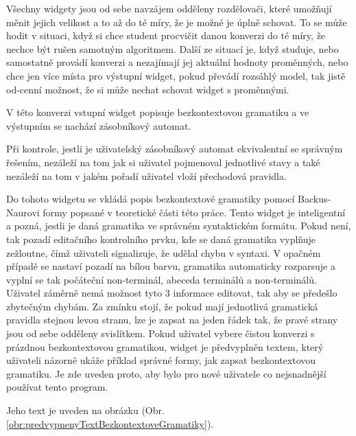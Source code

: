 Všechny widgety jsou od sebe navzájem odděleny rozdělovači, které umožňují měnit jejich velikost a to až do té míry, že je možné je úplně schovat. To se může hodit v situaci, když si chce student procvičit danou konverzi do té míry, že nechce být rušen samotným algoritmem. Další ze situací je, když studuje, nebo samostatně provádí konverzi a nezajímají jej aktuální hodnoty proměnných, nebo chce jen více místa pro výstupní widget, pokud převádí rozsáhlý model, tak jistě od-cenní možnost, že si může nechat schovat widget s proměnnými.

V této konverzi vstupní widget popisuje bezkontextovou gramatiku a ve výstupním se nachází zásobníkový automat.

Při kontrole, jestli je uživatelský zásobníkový automat ekvivalentní se správným řešením, nezáleží na tom jak si uživatel pojmenoval jednotlivé stavy a také nezáleží na tom v jakém pořadí uživatel vloží přechodová pravidla.




Do tohoto widgetu se vkládá popis bezkontextové gramatiky pomocí Backus-Naurovi formy popsané v teoretické části této práce. Tento widget je inteligentní a pozná, jestli je daná gramatika ve správném syntaktickém formátu. Pokud není, tak pozadí editačního kontrolního prvku, kde se daná gramatika vyplňuje zežloutne, čímž uživateli signalizuje, že udělal chybu v syntaxi. V opačném případě se nastaví pozadí na bílou barvu, gramatika automaticky rozparsuje a vyplní se tak počáteční non-terminál, abeceda terminálů a non-terminálů. Uživatel záměrně nemá možnost tyto 3 informace editovat, tak aby se předešlo zbytečným chybám. Za zmínku stojí, že pokud mají jednotlivá gramatická pravidla stejnou levou stranu, lze je zapsat na jeden řádek tak, že pravé strany jsou od sebe odděleny svislítkem. Pokud uživatel vybere čistou konverzi s prázdnou bezkontextovou gramatikou, widget je předvyplněn textem, který uživateli názorně ukáže příklad správné formy, jak zapsat bezkontextovou gramatiku. Je zde uveden proto, aby bylo pro nové uživatele co nejsnadnější používat tento program. 

Jeho text je uveden na obrázku (Obr. \ref{obr:predvypnenyTextBezkontextoveGramatiky}).

